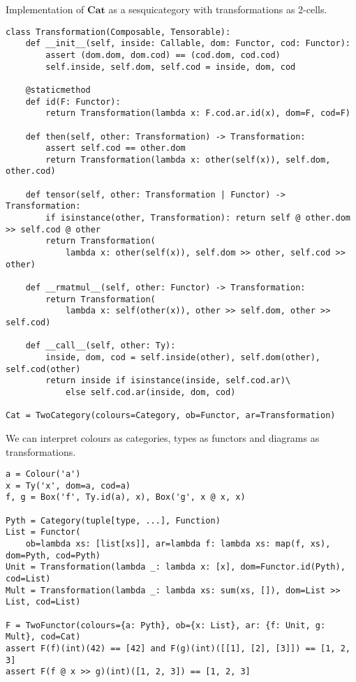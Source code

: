 \begin{python}\label{listing:Transformation}
{\normalfont Implementation of $\mathbf{Cat}$ as a sesquicategory with transformations as 2-cells.}

\begin{verbatim}
class Transformation(Composable, Tensorable):
    def __init__(self, inside: Callable, dom: Functor, cod: Functor):
        assert (dom.dom, dom.cod) == (cod.dom, cod.cod)
        self.inside, self.dom, self.cod = inside, dom, cod

    @staticmethod
    def id(F: Functor):
        return Transformation(lambda x: F.cod.ar.id(x), dom=F, cod=F)

    def then(self, other: Transformation) -> Transformation:
        assert self.cod == other.dom
        return Transformation(lambda x: other(self(x)), self.dom, other.cod)

    def tensor(self, other: Transformation | Functor) -> Transformation:
        if isinstance(other, Transformation): return self @ other.dom >> self.cod @ other
        return Transformation(
            lambda x: other(self(x)), self.dom >> other, self.cod >> other)

    def __rmatmul__(self, other: Functor) -> Transformation:
        return Transformation(
            lambda x: self(other(x)), other >> self.dom, other >> self.cod)

    def __call__(self, other: Ty):
        inside, dom, cod = self.inside(other), self.dom(other), self.cod(other)
        return inside if isinstance(inside, self.cod.ar)\
            else self.cod.ar(inside, dom, cod)

Cat = TwoCategory(colours=Category, ob=Functor, ar=Transformation)
\end{verbatim}
\end{python}

\begin{example}
We can interpret colours as categories, types as functors and diagrams as transformations.

\begin{verbatim}
a = Colour('a')
x = Ty('x', dom=a, cod=a)
f, g = Box('f', Ty.id(a), x), Box('g', x @ x, x)

Pyth = Category(tuple[type, ...], Function)
List = Functor(
    ob=lambda xs: [list[xs]], ar=lambda f: lambda xs: map(f, xs), dom=Pyth, cod=Pyth)
Unit = Transformation(lambda _: lambda x: [x], dom=Functor.id(Pyth), cod=List)
Mult = Transformation(lambda _: lambda xs: sum(xs, []), dom=List >> List, cod=List)

F = TwoFunctor(colours={a: Pyth}, ob={x: List}, ar: {f: Unit, g: Mult}, cod=Cat)
assert F(f)(int)(42) == [42] and F(g)(int)([[1], [2], [3]]) == [1, 2, 3]
assert F(f @ x >> g)(int)([1, 2, 3]) == [1, 2, 3]
\end{verbatim}
\end{example}

